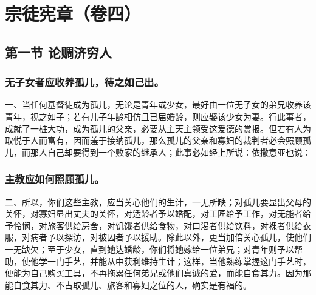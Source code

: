 
\section{宗徒宪章（卷四）}


\subsection{第一节  论赒济穷人}


\subsubsection{无子女者应收养孤儿，待之如己出。}

一、当任何基督徒成为孤儿，无论是青年或少女，最好由一位无子女的弟兄收养该青年，视之如子；若有儿子年龄相仿且已届婚龄，则应娶该少女为妻。行此事者，成就了一桩大功，成为孤儿的父亲，必要从主天主领受这爱德的赏报。但若有人为取悦于人而富有，因而羞于接纳孤儿，那么孤儿的父亲和寡妇的裁判者必会照顾孤儿，而那人自己却要得到一个败家的继承人；此事必如经上所说：依撒意亚也说：\par


\subsubsection{主教应如何照顾孤儿。}

二、所以，你们这些主教，应当关心他们的生计，一无所缺；对孤儿要显出父母的关怀，对寡妇显出丈夫的关怀，对适龄者予以婚配，对工匠给予工作，对无能者给予怜悯，对旅客供给房舍，对饥饿者供给食物，对口渴者供给饮料，对裸者供给衣服，对病者予以探访，对被囚者予以援助。除此以外，更当加倍关心孤儿，使他们一无缺欠；至于少女，直到她达婚龄，你们将她嫁给一位弟兄；对青年则予以帮助，使他学一门手艺，并能从中获利维持生计；这样，当他熟练掌握这门手艺时，便能为自己购买工具，不再拖累任何弟兄或他们真诚的爱，而能自食其力。因为那能自食其力、不占取孤儿、旅客和寡妇之位的人，确实是有福的。\par

